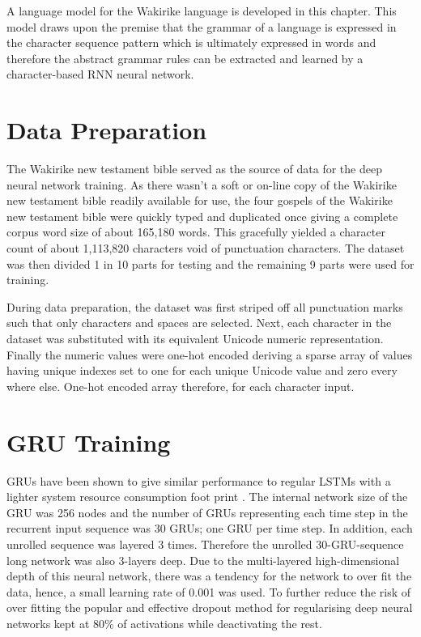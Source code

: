 A language model for the Wakirike language is developed in this chapter.  This model draws upon the premise that the grammar of a language is expressed in the character sequence pattern which is ultimately expressed in words and therefore the abstract grammar rules can be extracted and learned by a character-based RNN neural network.

\section{Data Preparation}
The Wakirike new testament bible served as the source of data for the deep neural network training. As there wasn’t a soft or on-line copy of the Wakirike new testament bible readily available for use, the four gospels of the Wakirike new testament bible were quickly typed and duplicated once giving a complete corpus word size of about 165,180 words. This gracefully yielded a character count of about 1,113,820 characters void of punctuation characters. The dataset was then divided 1 in 10 parts for testing and the remaining 9 parts were used for training.

During data preparation, the dataset was first striped off all punctuation marks such that only characters and spaces are selected. Next, each character in the dataset was substituted with its equivalent Unicode numeric representation. Finally the numeric values were one-hot encoded deriving a sparse array of values having unique indexes set to one for each unique Unicode value and zero every where else. One-hot encoded array therefore, for each character input.
\section{GRU Training}
GRUs have been shown to give similar performance to regular LSTMs with a lighter system resource consumption foot print \cite{cho2014learning}. The internal network size of the GRU was 256 nodes and the number of GRUs representing each time step in the recurrent input sequence was 30 GRUs; one GRU per time step. In addition, each unrolled sequence was layered 3 times. Therefore the unrolled 30-GRU-sequence long network was also 3-layers deep. Due to the multi-layered high-dimensional depth of this neural network, there was a tendency for the network to over fit the data, hence, a small learning rate of 0.001 was used. To further reduce the risk of over fitting the popular and effective dropout method for regularising deep neural networks kept at 80\% of activations while deactivating the rest.
